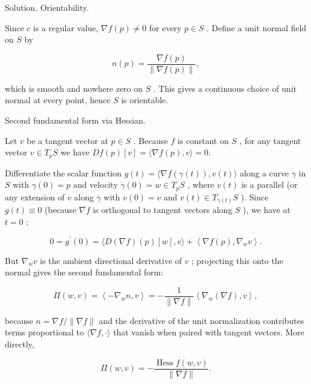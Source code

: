 \documentclass[10pt]{article}
\begin{document}
Solution. Orientability.

Since \(c\) is a regular value, \(\nabla f\left( p\right)  \neq  0\) for every \(p \in  S\) . Define a unit normal field on \(S\) by

\[
n\left( p\right)  = \frac{\nabla f\left( p\right) }{\parallel \nabla f\left( p\right) \parallel },
\]

which is smooth and nowhere zero on \(S\) . This gives a continuous choice of unit normal at every point, hence \(S\) is orientable.

Second fundamental form via Hessian.

Let \(v\) be a tangent vector at \(p \in  S\) . Because \(f\) is constant on \(S\) , for any tangent vector \(v \in  {T}_{p}S\) we have \({Df}\left( p\right) \left\lbrack  v\right\rbrack   = \langle \nabla f\left( p\right) ,v\rangle  = 0.\)

Differentiate the scalar function \(g\left( t\right)  = \langle \nabla f\left( {\gamma \left( t\right) }\right) ,v\left( t\right) \rangle\) along a curve \(\gamma\) in \(S\) with \(\gamma \left( 0\right)  = p\) and velocity \(\dot{\gamma }\left( 0\right)  = w \in  {T}_{p}S\) , where \(v\left( t\right)\) is a parallel (or any extension of \(v\) along \(\gamma\) with \(v\left( 0\right)  = v\) and \(v\left( t\right)  \in  {T}_{\gamma \left( t\right) }S\) ). Since \(g\left( t\right)  \equiv  0\) (because \(\nabla f\) is orthogonal to tangent vectors along \(S\) ), we have at \(t = 0\) :

\[
0 = {g}^{\prime }\left( 0\right)  = \langle D\left( {\nabla f}\right) \left( p\right) \left\lbrack  w\right\rbrack  ,v\rangle  + \left\langle  {\nabla f\left( p\right) ,{\nabla }_{w}v}\right\rangle  .
\]

But \({\nabla }_{w}v\) is the ambient directional derivative of \(v\) ; projecting this onto the normal gives the second fundamental form:

\[
\Pi \left( {w,v}\right)  = \left\langle  {-{\nabla }_{w}n,v}\right\rangle   =  - \frac{1}{\parallel \nabla f\parallel }\left\langle  {{\nabla }_{w}\left( {\nabla f}\right) ,v}\right\rangle  ,
\]

because \(n = \nabla f/\parallel \nabla f\parallel\) and the derivative of the unit normalization contributes terms proportional to \(\langle \nabla f, \cdot  \rangle\) that vanish when paired with tangent vectors. More directly,

\[
\Pi \left( {w,v}\right)  =  - \frac{\operatorname{Hess}f\left( {w,v}\right) }{\parallel \nabla f\parallel }.
\]
\end{document}
